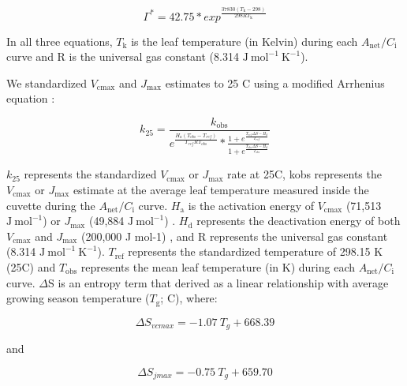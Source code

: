     \begin{equation} \label{eq_2.5}
        \Gamma^\mathrm{*}=42.75*exp^{\frac{37830(T_\mathrm{k}-298)}{298RT_\mathrm{k}}}
    \end{equation}

    \noindent In all three equations, $T_\mathrm{k}$ is the leaf temperature (in Kelvin) during each $A_\mathrm{{net}}/C_\mathrm{i}$ curve and R is the universal gas constant (8.314 $\mathrm{J\ mol^{-1}\ K^{-1}}$).

    We standardized $V_{\mathrm{cmax}}$ and $J_{\mathrm{max}}$ estimates to 25 \textdegree{}C using a modified Arrhenius equation :

    \begin{equation} \label{eq_2.6}
        k_\mathrm{25}=\frac{k_\mathrm{obs}}{e^{\frac{H_a(T_{obs}-T_{ref})}{T_{ref}RT_{obs}}}*\frac{1+e^{\frac{T_{ref}\Delta S-H_d}{T_{ref}}}}{1+e^{\frac{T_{obs}\Delta S-H_d}{T_{obs}}}}}
    \end{equation}

    $k_\mathrm{25}$ represents the standardized $V_{\mathrm{cmax}}$ or $J_{\mathrm{max}}$ rate at 25\textdegree{}C, kobs represents the $V_{\mathrm{cmax}}$ or $J_{\mathrm{max}}$ estimate at the average leaf temperature measured inside the cuvette during the $A_\mathrm{{net}}/C_\mathrm{i}$ curve. $H_\mathrm{a}$ is the activation energy of $V_{\mathrm{cmax}}$ (71,513 $\mathrm{J\ mol^{-1}}$)  or $J_{\mathrm{max}}$ (49,884 $\mathrm{J\ mol^{-1}}$) . $H_\mathrm{d}$ represents the deactivation energy of both $V_{\mathrm{cmax}}$ and $J_{\mathrm{max}}$ (200,000 J mol-1) , and R represents the universal gas constant (8.314 $\mathrm{J\ mol^{-1}\ K^{-1}}$). $T_\mathrm{ref}$ represents the standardized temperature of 298.15 K (25\textdegree{}C) and $T_\mathrm{obs}$ represents the mean leaf temperature (in K) during each $A_\mathrm{{net}}/C_\mathrm{i}$ curve. $\Delta$S is an entropy term that  derived as a linear relationship with average growing season temperature ($T_\mathrm{g}$; \textdegree{}C), where: 

    \begin{equation} \label{eq_2.7}
        \Delta S_{vcmax}=-1.07\ T_{g}+668.39
    \end{equation}
    
    \noindent and
   
    \begin{equation} \label{eq_2.8}
        \Delta S_{jmax}=-0.75\ T_{g}+659.70
    \end{equation}

